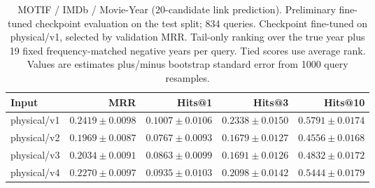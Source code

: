\begin{table}[t]
\centering
\small
\begin{tabular}{lrrrr}
\toprule
Input & MRR & Hits@1 & Hits@3 & Hits@10 \\
\midrule
physical/v1 & $0.2419 \pm 0.0098$ & $0.1007 \pm 0.0106$ & $0.2338 \pm 0.0150$ & $0.5791 \pm 0.0174$ \\
physical/v2 & $0.1969 \pm 0.0087$ & $0.0767 \pm 0.0093$ & $0.1679 \pm 0.0127$ & $0.4556 \pm 0.0168$ \\
physical/v3 & $0.2034 \pm 0.0091$ & $0.0863 \pm 0.0099$ & $0.1691 \pm 0.0126$ & $0.4832 \pm 0.0172$ \\
physical/v4 & $0.2270 \pm 0.0097$ & $0.0935 \pm 0.0103$ & $0.2098 \pm 0.0142$ & $0.5444 \pm 0.0179$ \\
\bottomrule
\end{tabular}
\caption{MOTIF / IMDb / Movie-Year (20-candidate link prediction). Preliminary fine-tuned checkpoint evaluation on the test split; 834 queries. Checkpoint fine-tuned on physical/v1, selected by validation MRR. Tail-only ranking over the true year plus 19 fixed frequency-matched negative years per query. Tied scores use average rank. Values are estimates plus/minus bootstrap standard error from 1000 query resamples.}
\label{tab:motif-movie_year-link_prediction}
\end{table}
